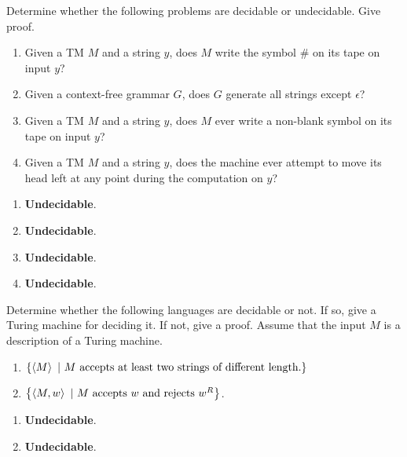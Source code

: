 \documentclass{article}
\begin{document}
\begin{exercise}
Determine whether the following problems are decidable or undecidable. Give proof.
\begin{enumerate}
 \item Given a TM $M$ and a string $y$, does $M$ write the symbol $\#$ on its tape on input $y$?
 \item Given a context-free grammar $G$, does $G$ generate all strings except $\epsilon$?
 \item Given a TM $M$ and a string $y$, does $M$ ever write a non-blank symbol on its tape on input $y$?
 \item Given a TM $M$ and a string $y$, does the machine ever attempt to move its head left at any point during the computation on $y$?
\end{enumerate}
\begin{answer}
\begin{enumerate}
 \item \textbf{Undecidable}.
 \item \textbf{Undecidable}.
 \item \textbf{Undecidable}.
 \item \textbf{Undecidable}.
\end{enumerate}
\end{answer}
\end{exercise}

\begin{exercise}
Determine whether the following languages are decidable or not. If so, give a Turing machine for deciding it. If not, give a proof. Assume that the input $M$ is a description of a Turing machine.
\begin{enumerate}
 \item $\left\{ \left\langle M \right\rangle\ |\ \mbox{$M$ accepts at least two strings of different length.} \right\}$
 \item $\left\{ \left\langle M,w \right\rangle\ |\ \mbox{$M$ accepts $w$ and rejects $w^R$} \right\}$.
\end{enumerate}
\end{exercise}
\begin{answer}
\begin{enumerate}
 \item \textbf{Undecidable}.
 \item \textbf{Undecidable}.
\end{enumerate}

\end{answer}
\end{document}
